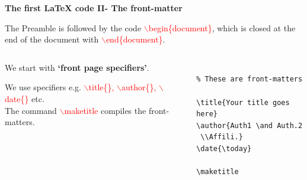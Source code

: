 \documentclass[xcolor=dvipsnames]{beamer}
\begin{document}
\begin{frame}[fragile]{\textbf{The first \LaTeX{} code II- The front-matter}}



The Preamble is followed by the code \textcolor{red}{$\backslash$begin\{document\}}, 
which is closed at the end of the document with \textcolor{red}{$\backslash$end\{document\}}.\\

 \vspace{0.2cm}
\begin{columns}
\begin{column}{0.4\textwidth}


We start with \textbf{`front page specifiers'}. \\
 \vspace{0.2cm}
 
We use specifiers e.g.
  \textcolor{red}{$\backslash$title\{\},  
  $\backslash$author\{\}, $\backslash$date\{\}} etc.\\
  
   \vspace{0.4cm}
The command  \textcolor{red}{$\backslash$maketitle} compiles the front-matters.

\end{column}

\begin{column}{0.5\textwidth}
\small
\begin{Verbatim}[frame=single]

% These are front-matters

\title{Your title goes here}
\author{Auth1 \and Auth.2
 \\Affili.}
\date{\today}

\maketitle

\end{Verbatim}
\end{column}


\end{columns}


\end{frame}
\end{document}
